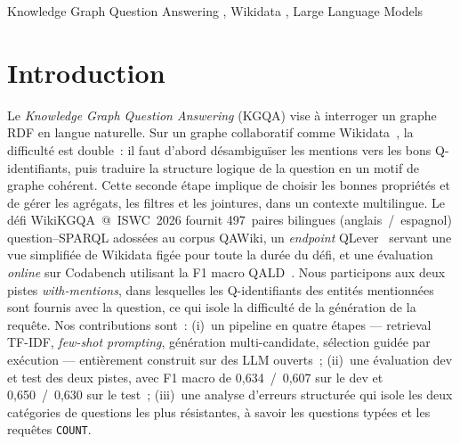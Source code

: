\documentclass[]{ceurart}
\begin{document}
\begin{keywords}
  Knowledge Graph Question Answering \sep
  Wikidata \sep
  Large Language Models
\end{keywords}

\maketitle

\section{Introduction}
\label{sec:intro}
Le \emph{Knowledge Graph Question Answering} (KGQA) vise à interroger un graphe RDF en langue naturelle. Sur un graphe collaboratif comme Wikidata~\cite{vrandecic2014wikidata}, la difficulté est double~: il faut d'abord désambiguïser les mentions vers les bons Q-identifiants, puis traduire la structure logique de la question en un motif de graphe cohérent. Cette seconde étape implique de choisir les bonnes propriétés et de gérer les agrégats, les filtres et les jointures, dans un contexte multilingue. Le défi WikiKGQA~@~ISWC~2026 fournit \num{497}~paires bilingues (anglais~/~espagnol) question–SPARQL adossées au corpus QAWiki, un \emph{endpoint} QLever~\cite{bast2017qlever} servant une vue simplifiée de Wikidata figée pour toute la durée du défi, et une évaluation \emph{online} sur Codabench utilisant la F1 macro QALD~\cite{perevalov2022qald10}. Nous participons aux deux pistes \emph{with-mentions}, dans lesquelles les Q-identifiants des entités mentionnées sont fournis avec la question, ce qui isole la difficulté de la génération de la requête. Nos contributions sont~: (i)~un pipeline en quatre étapes — retrieval TF-IDF, \emph{few-shot prompting}, génération multi-candidate, sélection guidée par exécution — entièrement construit sur des LLM ouverts~; (ii)~une évaluation dev et test des deux pistes, avec F1 macro de 0{,}634~/~0{,}607 sur le dev et 0{,}650~/~0{,}630 sur le test~; (iii)~une analyse d'erreurs structurée qui isole les deux catégories de questions les plus résistantes, à savoir les questions typées et les requêtes \texttt{COUNT}.

\end{document}
